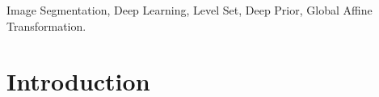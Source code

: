\documentclass[journal]{IEEEtran}
\begin{document}
%



\maketitle

\begin{abstract}

\end{abstract}\label{Abstract}

\begin{IEEEkeywords}
Image Segmentation, Deep Learning, Level Set, Deep Prior, Global Affine Transformation.
\end{IEEEkeywords}


%
\IEEEpeerreviewmaketitle



\section{Introduction}\label{sec:Introduction}

\end{document}
